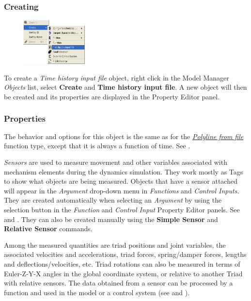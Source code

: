 \subsubsection{Creating}

\begin{figure}
  \vspace{-5mm}
  \center
  \includegraphics[width=0.3\textwidth]{Figures/4-TimeHistoryInputFile}
\end{figure}

To create a {\sl Time history input file} object, right click in the
Model Manager {\sl Objects} list, select \textbf{Create} and
\textbf{Time history input file}. A new object will then be created and
its properties are displayed in the Property Editor panel.

\subsubsection{Properties}

The behavior and options for this object is the same as for the
\protect\hyperlink{polyline-from-file}{\sl Polyline from file} function type,
except that it is always a function of time.
See .



{\sl Sensors} are used to measure movement and other variables
associated with mechanism elements during the dynamics simulation.
They work mostly as Tags to show what objects are being measured.
Objects that have a sensor attached will appear in the {\sl Argument}
drop-down menu in {\sl Functions} and {\sl Control Inputs.}
They are created automatically when selecting an
{\sl Argument} by using the selection button in the {\sl Function} and
{\sl Control Input} Property Editor panels. See
 and
. They can also be
created manually using the \textbf{Simple Sensor} and
\textbf{Relative Sensor} commands.

Among the measured quantities are triad positions and joint variables,
the associated velocities and accelerations, triad forces, spring/damper
forces, lengths and deflections/velocities, etc. Triad rotations can
also be measured in terms of Euler-Z-Y-X angles in the global coordinate
system, or relative to another
Triad with relative sensors. The data obtained from a sensor can be
processed by a function and used in the model or a control system (see
 and
).

